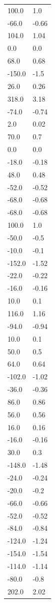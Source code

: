 \begin{longtable}{ll}
100.0 & 1.0 \\
-66.0 & -0.66 \\
104.0 & 1.04 \\
0.0 & 0.0 \\
68.0 & 0.68 \\
-150.0 & -1.5 \\
26.0 & 0.26 \\
318.0 & 3.18 \\
-74.0 & -0.74 \\
2.0 & 0.02 \\
70.0 & 0.7 \\
0.0 & 0.0 \\
-18.0 & -0.18 \\
48.0 & 0.48 \\
-52.0 & -0.52 \\
-68.0 & -0.68 \\
-68.0 & -0.68 \\
100.0 & 1.0 \\
-50.0 & -0.5 \\
-10.0 & -0.1 \\
-152.0 & -1.52 \\
-22.0 & -0.22 \\
-16.0 & -0.16 \\
10.0 & 0.1 \\
116.0 & 1.16 \\
-94.0 & -0.94 \\
10.0 & 0.1 \\
50.0 & 0.5 \\
64.0 & 0.64 \\
-102.0 & -1.02 \\
-36.0 & -0.36 \\
86.0 & 0.86 \\
56.0 & 0.56 \\
16.0 & 0.16 \\
-16.0 & -0.16 \\
30.0 & 0.3 \\
-148.0 & -1.48 \\
-24.0 & -0.24 \\
-20.0 & -0.2 \\
-66.0 & -0.66 \\
-52.0 & -0.52 \\
-84.0 & -0.84 \\
-124.0 & -1.24 \\
-154.0 & -1.54 \\
-114.0 & -1.14 \\
-80.0 & -0.8 \\
202.0 & 2.02 \\

\end{longtable}
